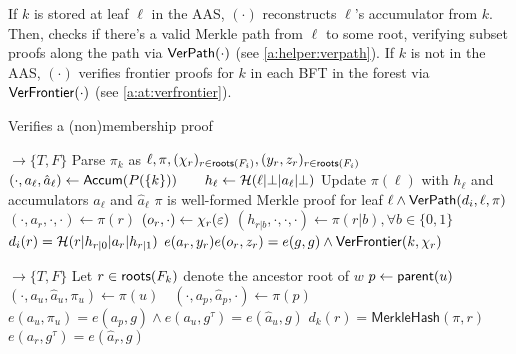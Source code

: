 If $k$ is stored at leaf $\ell$ in the AAS, {\vermemb}$(\cdot)$ reconstructs $\ell$'s accumulator from $k$.
Then, checks if there's a valid Merkle path from $\ell$ to some root, verifying subset proofs along the path via $\mathsf{VerPath}(\cdot)$ (see \cref{a:helper:verpath}).
If $k$ is not in the AAS, {\vermemb}$(\cdot)$ verifies frontier proofs for $k$ in each BFT in the forest via $\mathsf{VerFrontier}(\cdot)$ (see \cref{a:at:verfrontier}).

\begin{algorithm}[H]%
    \caption{\small Verifies a (non)membership proof}
    \label{a:aas:vermemb}
    \label{a:helper:verpath}
    \footnotesize
    \begin{algorithmic}[1]
     $\rightarrow \{T,F\}$
    \State Parse $\pi_{k}$ as $\ell, \pi, (\chi_r)_{r\in \mathsf{roots}(F_i)}, (y_r, z_r)_{r\in \mathsf{roots}(F_i)}$
     
    \label{a:aas:vermemb:foreach-leaf}
        \label{a:aas:vermemb:verpath-begin}
        \State $(\cdot, a_\ell, \hat{a}_\ell)\gets \mathsf{Accum}(P(\{k\}))\qquad h_\ell \gets \mathcal{H}(\ell|\bot|a_\ell|\bot)$
        \State Update $\pi(\ell)$ with $h_\ell$ and accumulators $a_\ell$ and $\hat{a}_\ell$
        \Assert $\pi$ is well-formed Merkle proof for leaf $\ell \wedge {\verpath(d_i, \ell, \pi)}$
        \label{a:aas:vermemb:verpath-end}
    \Else  {}
        \label{a:aas:vermemb:verfrontier-begin}
         
            \State $(\cdot,a_{r},\cdot,\cdot)\gets \pi(r)$ \quad $(o_r, \cdot) \gets \chi_r(\varepsilon)$
            \State $({h}_{r|b},\cdot,\cdot,\cdot) \gets \pi(r|b),\forall b\in \{0,1\}$
            \Assert $d_i(r) = \mathcal{H}(r|h_{r|0}|a_r|h_{r|1})$
            \Assert $e(a_r,y_r)e(o_r,z_r) = e(g,g) \wedge \mathsf{VerFrontier}(k, \chi_r)$
        \EndFor
        \label{a:aas:vermemb:verfrontier-end}
    \EndIf
    \EndFunction

     $\rightarrow \{T,F\}$
        \State Let $r\in \mathsf{roots}(F_k)$ denote the ancestor root of $w$
            \State $p \gets \mathsf{parent}(u)$
            \State $(\cdot, a_{u}, \hat{a}_{u}, \pi_{u}) \gets \pi(u)\quad(\cdot, a_{p}, \hat{a}_{p}, \cdot) \gets \pi(p)$
            \Assert $e(a_u, \pi_u) = e(a_p, g) \wedge e(a_u, g^\tau) = e(\hat{a}_u, g)$
            \label{a:aas:verpath:extractability-check}
        \EndFor
        \Assert $d_k(r) = \mathsf{MerkleHash}(\pi, r)$ 
        \label{a:aas:verpath:merklehash}
        \Assert $e(a_r, g^\tau) = e(\hat{a}_r, g)$


\end{algorithmic}
\end{algorithm}
